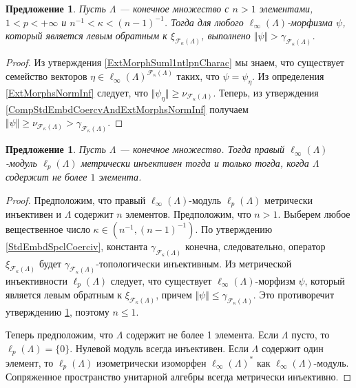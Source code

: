 \documentclass[12pt]{article}
\newtheorem{proposition}[theorem]{Предложение}
\begin{document}
\begin{proposition}\label{RetrPrblmNoSln}
    Пусть $\Lambda$ --- конечное множество с $n>1$ элементами, $1<p<+\infty$ 
    и $n^{-1}<\kappa<(n-1)^{-1}$. Тогда для 
    любого $\ell_\infty(\Lambda)$-морфизма $\psi$, который является левым 
    обратным к $\xi_{\mathcal{F}_{\kappa}(\Lambda)}$, 
    выполнено $\Vert \psi\Vert>\gamma_{\mathcal{F}_{\kappa}(\Lambda)}$.  
\end{proposition}
\begin{proof}
    Из утверждения \ref{ExtMorphSuml1ntlpnCharac} мы знаем, что существует 
    семейство 
    векторов $\eta\in\ell_\infty(\Lambda)^{\mathcal{F}_{\kappa}(\Lambda)}$ 
    таких, что  $\psi=\psi_{\eta}$. Из определения \ref{ExtMorphsNormInf} 
    следует, 
    что $\Vert \psi_{\eta}\Vert\geq \nu_{\mathcal{F}_{\kappa}(\Lambda)}$. 
    Теперь, из утверждения \ref{CompStdEmbdCoercvAndExtMorphsNormInf} получаем 
    $\Vert\psi\Vert\geq\nu_{\mathcal{F}_{\kappa}(\Lambda)} > 
    \gamma_{\mathcal{F}_{\kappa}(\Lambda)}$.
\end{proof}

\begin{proposition}\label{linftnModlpnIsntMetInjCharac}
    Пусть $\Lambda$ --- конечное множество. Тогда 
    правый $\ell_\infty(\Lambda)$-модуль $\ell_p(\Lambda)$ метрически 
    инъективен тогда и только тогда, когда $\Lambda$ содержит не 
    более $1$ элемента.
\end{proposition}
\begin{proof}
    Предположим, что правый $\ell_\infty(\Lambda)$-модуль $\ell_p(\Lambda)$ 
    метрически инъективен и $\Lambda$ содержит $n$ элементов. Предположим, 
    что $n>1$. Выберем любое вещественное число $\kappa\in(n^{-1},(n-1)^{-1})$. 
    По утверждению \ref{StdEmbdSpclCoerciv}, 
    константа $\gamma_{\mathcal{F}_{\kappa}(\Lambda)}$ конечна, 
    следовательно, оператор $\xi_{\mathcal{F}_{\kappa}(\Lambda)}$
    будет $\gamma_{\mathcal{F}_{\kappa}(\Lambda)}$-топологически инъективным. 
    Из метрической инъективности $\ell_p(\Lambda)$ следует, что существует 
    $\ell_\infty(\Lambda)$-морфизм $\psi$, который является левым обратным к 
    $\xi_{\mathcal{F}_{\kappa}(\Lambda)}$, 
    причем $\Vert\psi\Vert\leq\gamma_{\mathcal{F}_{\kappa}(\Lambda)}$. Это 
    противоречит утверждению \ref{linftnModlpnIsntMetInjCharac}, 
    поэтому $n\leq 1$.

    Теперь предположим, что $\Lambda$ содержит не более 1 элемента. 
    Если $\Lambda$ пусто, то $\ell_p(\Lambda)=\{0\}$. Нулевой модуль всегда 
    инъективен. Если $\Lambda$ содержит один элемент, то $\ell_p(\Lambda)$ 
    изометрически изоморфен $\ell_\infty(\Lambda)^*$ 
    как $\ell_\infty(\Lambda)$-модуль. Сопряженное пространство унитарной 
    алгебры всегда метрически инъективно.
\end{proof}
\end{document}

